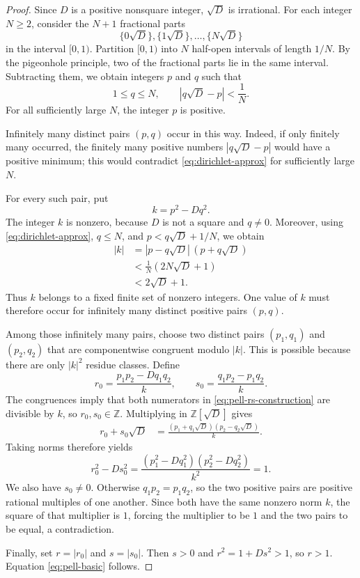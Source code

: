 \documentclass[11pt]{article}
\theoremstyle{remark}
\newcommand{\Z}{\mathbb Z}
\begin{document}
\begin{proof}
Since $D$ is a positive nonsquare integer, $\sqrt D$ is irrational.  For each integer $N\ge 2$, consider the $N+1$ fractional parts
\[
 \{0\sqrt D\},\{1\sqrt D\},\ldots,\{N\sqrt D\}
\]
in the interval $[0,1)$.  Partition $[0,1)$ into $N$ half-open intervals of length $1/N$.  By the pigeonhole principle, two of the fractional parts lie in the same interval.  Subtracting them, we obtain integers $p$ and $q$ such that
\begin{equation}\label{eq:dirichlet-approx}
 1\le q\le N,
 \qquad
 |q\sqrt D-p|<\frac1N.
\end{equation}
For all sufficiently large $N$, the integer $p$ is positive.

Infinitely many distinct pairs $(p,q)$ occur in this way.  Indeed, if only finitely many occurred, the finitely many positive numbers $|q\sqrt D-p|$ would have a positive minimum; this would contradict \eqref{eq:dirichlet-approx} for sufficiently large $N$.

For every such pair, put
\[
 k=p^2-Dq^2.
\]
The integer $k$ is nonzero, because $D$ is not a square and $q\ne0$.  Moreover, using \eqref{eq:dirichlet-approx}, $q\le N$, and
$p<q\sqrt D+1/N$, we obtain
\begin{align*}
 |k|
 &=|p-q\sqrt D|\,(p+q\sqrt D)\\
 &<\frac1N\left(2N\sqrt D+1\right)\\
 &<2\sqrt D+1.
\end{align*}
Thus $k$ belongs to a fixed finite set of nonzero integers.  One value of $k$ must therefore occur for infinitely many distinct positive pairs $(p,q)$.

Among those infinitely many pairs, choose two distinct pairs $(p_1,q_1)$ and $(p_2,q_2)$ that are componentwise congruent modulo $|k|$.  This is possible because there are only $|k|^2$ residue classes.  Define
\begin{equation}\label{eq:pell-rs-construction}
 r_0=\frac{p_1p_2-Dq_1q_2}{k},
 \qquad
 s_0=\frac{q_1p_2-p_1q_2}{k}.
\end{equation}
The congruences imply that both numerators in \eqref{eq:pell-rs-construction} are divisible by $k$, so $r_0,s_0\in\Z$.  Multiplying in $\Z[\sqrt D]$ gives
\begin{align*}
 r_0+s_0\sqrt D
 &=\frac{(p_1+q_1\sqrt D)(p_2-q_2\sqrt D)}{k}.
\end{align*}
Taking norms therefore yields
\[
 r_0^2-Ds_0^2
 =\frac{(p_1^2-Dq_1^2)(p_2^2-Dq_2^2)}{k^2}
 =1.
\]
We also have $s_0\ne0$.  Otherwise $q_1p_2=p_1q_2$, so the two positive pairs are positive rational multiples of one another.  Since both have the same nonzero norm $k$, the square of that multiplier is $1$, forcing the multiplier to be $1$ and the two pairs to be equal, a contradiction.

Finally, set $r=|r_0|$ and $s=|s_0|$.  Then $s>0$ and
$r^2=1+Ds^2>1$, so $r>1$.  Equation \eqref{eq:pell-basic} follows.
\end{proof}
\end{document}
